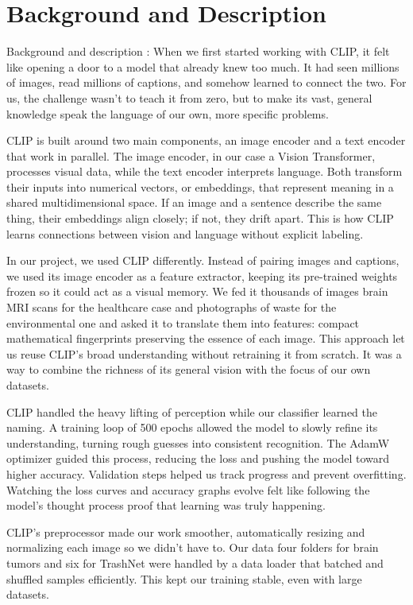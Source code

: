 \documentclass[12pt]{article}
\begin{document}
\section{Background and Description}

Background and description : When we first started working with CLIP, it felt like opening a door to a model that already knew too much. It had seen millions of images, read millions of captions, and somehow learned to connect the two. For us, the challenge wasn’t to teach it from zero, but to make its vast, general knowledge speak the language of our own, more specific problems.

CLIP is built around two main components, an image encoder and a text encoder that work in parallel. The image encoder, in our case a Vision Transformer, processes visual data, while the text encoder interprets language. Both transform their inputs into numerical vectors, or embeddings, that represent meaning in a shared multidimensional space. If an image and a sentence describe the same thing, their embeddings align closely; if not, they drift apart. This is how CLIP learns connections between vision and language without explicit labeling.

In our project, we used CLIP differently. Instead of pairing images and captions, we used its image encoder as a feature extractor, keeping its pre-trained weights frozen so it could act as a visual memory. We fed it thousands of images brain MRI scans for the healthcare case and photographs of waste for the environmental one and asked it to translate them into features: compact mathematical fingerprints preserving the essence of each image.
This approach let us reuse CLIP’s broad understanding without retraining it from scratch. It was a way to combine the richness of its general vision with the focus of our own datasets.

CLIP handled the heavy lifting of perception while our classifier learned the naming. A training loop of 500 epochs allowed the model to slowly refine its understanding, turning rough guesses into consistent recognition. The AdamW optimizer guided this process, reducing the loss and pushing the model toward higher accuracy. Validation steps helped us track progress and prevent overfitting. Watching the loss curves and accuracy graphs evolve felt like following the model’s thought process proof that learning was truly happening.

CLIP’s preprocessor made our work smoother, automatically resizing and normalizing each image so we didn’t have to. Our data four folders for brain tumors and six for TrashNet were handled by a data loader that batched and shuffled samples efficiently. This kept our training stable, even with large datasets.
\end{document}
